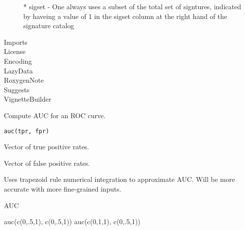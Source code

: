 \documentclass[letterpaper]{book}
\begin{document}
\begin{description}
{* sigset - One always uses a subset of the total set of signtures, indicated by haveing a value of 1 in the sigset column at the right hand of the signature catalog}
\item[Imports]
\item[License]
\item[Encoding]
\item[LazyData]
\item[RoxygenNote]
\item[Suggests]
\item[VignetteBuilder]
\end{description}
%
\begin{Description}\relax
Compute AUC for an ROC curve.
\end{Description}
%
\begin{Usage}
\begin{verbatim}
auc(tpr, fpr)
\end{verbatim}
\end{Usage}
%
\begin{Arguments}
\begin{ldescription}
\item[\code{tpr}] Vector of true positive rates.

\item[\code{fpr}] Vector of false positive rates.
\end{ldescription}
\end{Arguments}
%
\begin{Details}\relax
Uses trapezoid rule numerical integration to approximate AUC. Will be more
accurate with more fine-grained inputs.
\end{Details}
%
\begin{Value}
AUC
\end{Value}
%
\begin{Examples}
\begin{ExampleCode}
auc(c(0,.5,1), c(0,.5,1))
auc(c(0,1,1), c(0,.5,1))
\end{ExampleCode}
\end{Examples}
\end{document}
